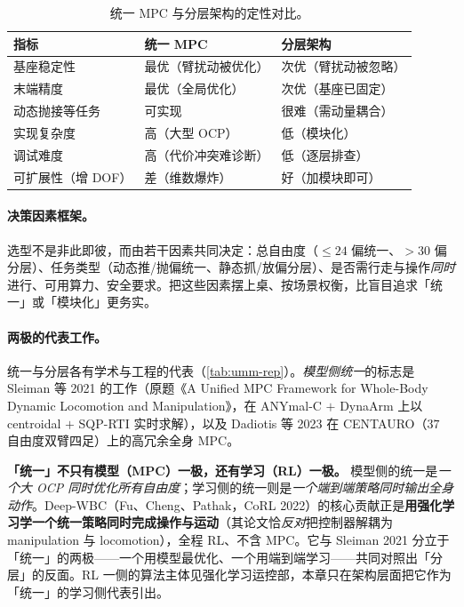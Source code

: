 \begin{table}[H]\centering\small
\caption{统一 MPC 与分层架构的定性对比。}
\label{tab:umm-arch}
\begin{tabular}{lll}
\toprule
指标 & 统一 MPC & 分层架构 \\
\midrule
基座稳定性 & 最优（臂扰动被优化） & 次优（臂扰动被忽略） \\
末端精度 & 最优（全局优化） & 次优（基座已固定） \\
动态抛接等任务 & 可实现 & 很难（需动量耦合） \\
实现复杂度 & 高（大型 OCP） & 低（模块化） \\
调试难度 & 高（代价冲突难诊断） & 低（逐层排查） \\
可扩展性（增 DOF） & 差（维数爆炸） & 好（加模块即可） \\
\bottomrule
\end{tabular}
\end{table}

\paragraph{决策因素框架。}
选型不是非此即彼，而由若干因素共同决定：总自由度（$\le24$ 偏统一、$>30$ 偏分层）、任务类型（动态推/抛偏统一、静态抓/放偏分层）、是否需行走与操作\emph{同时}进行、可用算力、安全要求。把这些因素摆上桌、按场景权衡，比盲目追求「统一」或「模块化」更务实。

\paragraph{两极的代表工作。}
统一与分层各有学术与工程的代表（\cref{tab:umm-rep}）。\emph{模型侧统一}的标志是 Sleiman 等 2021 的工作\cite{sleiman2021unified}（原题《A Unified MPC Framework for Whole-Body Dynamic Locomotion and Manipulation》，在 ANYmal-C $+$ DynaArm 上以 centroidal $+$ SQP-RTI 实时求解），以及 Dadiotis 等 2023 在 CENTAURO（$37$ 自由度双臂四足）上的高冗余全身 MPC\cite{dadiotis2023wholebody}。

\begin{insight}
\textbf{「统一」不只有模型（MPC）一极，还有学习（RL）一极。}\;
模型侧的统一是\emph{一个大 OCP 同时优化所有自由度}；学习侧的统一则是\emph{一个端到端策略同时输出全身动作}。Deep-WBC（Fu、Cheng、Pathak，CoRL 2022）的核心贡献正是\textbf{用强化学习学一个统一策略同时完成操作与运动}（其论文恰\emph{反对}把控制器解耦为 manipulation 与 locomotion），全程 RL、不含 MPC\cite{fu2022deep}。它与 Sleiman 2021 分立于「统一」的两极——一个用模型最优化、一个用端到端学习——共同对照出「分层」的反面。RL 一侧的算法主体见强化学习运控部，本章只在架构层面把它作为「统一」的学习侧代表引出。
\end{insight}

